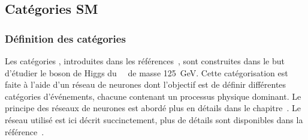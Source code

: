 \subsection{Catégories \og SM \fg{}}\label{chapter-HTT_analysis-section-categorisation-SM}
\subsubsection{Définition des catégories}
Les catégories \CATsm, introduites dans les références~\cite{CMS-NOTE-2019-177,CMS-NOTE-2019-178}, sont construites dans le but d'étudier le boson de Higgs du \SM\ \higgs\ de masse \SI{125}{\GeV}.
Cette catégorisation est faite à l'aide d'un réseau de neurones dont l'objectif est de définir différentes catégories d'événements, chacune contenant un processus physique dominant.
Le principe des réseaux de neurones est abordé plus en détails dans le chapitre~.
Le réseau utilisé est ici décrit succinctement, plus de détails sont disponibles dans la référence~\cite{CMS-NOTE-2019-178}.
